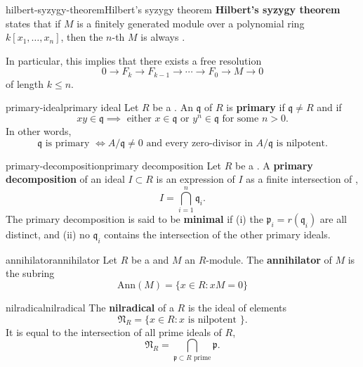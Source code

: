 \begin{topic}{hilbert-syzygy-theorem}{Hilbert's syzygy theorem}
    \textbf{Hilbert's syzygy theorem} states that if $M$ is a finitely generated module over a polynomial ring $k[x_1, \ldots, x_n]$, then the $n$-th  $M$ is always .
    
    In particular, this implies that there exists a free resolution
    \[ 0 \to F_k \to F_{k - 1} \to \cdots \to F_0 \to M \to 0 \]
    of length $k \le n$.
\end{topic}

\begin{topic}{primary-ideal}{primary ideal}
    Let $R$ be a . An  $\mathfrak{q}$ of $R$ is \textbf{primary} if $\mathfrak{q} \ne R$ and if
    \[ xy \in \mathfrak{q} \implies \text{ either } x \in \mathfrak{q} \text{ or } y^n \in \mathfrak{q} \text{ for some } n > 0 . \]
    In other words,
    \[ \mathfrak{q} \text{ is primary } \iff A / \mathfrak{q} \ne 0 \text{ and every zero-divisor in } A / \mathfrak{q} \text{ is nilpotent} . \]
\end{topic}

\begin{topic}{primary-decomposition}{primary decomposition}
    Let $R$ be a . A \textbf{primary decomposition} of an ideal $I \subset R$ is an expression of $I$ as a finite intersection of ,
    \[ I = \bigcap_{i = 1}^{n} \mathfrak{q}_i . \]
    The primary decomposition is said to be \textbf{minimal} if (i) the $\mathfrak{p}_i = r(\mathfrak{q}_i)$ are all distinct, and (ii) no $\mathfrak{q}_i$ contains the intersection of the other primary ideals.
\end{topic}

\begin{topic}{annihilator}{annihilator}
    Let $R$ be a  and $M$ an $R$-module. The \textbf{annihilator} of $M$ is the subring
    \[ \text{Ann}(M) = \{ x \in R : xM = 0 \} \]
\end{topic}

\begin{topic}{nilradical}{nilradical}
     The \textbf{nilradical} of a  $R$ is the ideal of  elements
     \[ \mathfrak{N}_R = \{ x \in R : x \text{ is nilpotent } \} . \]
     It is equal to the intersection of all prime ideals of $R$,
     \[ \mathfrak{N}_R = \bigcap_{\mathfrak{p} \subset R \text{ prime}} \mathfrak{p} . \]
\end{topic}

